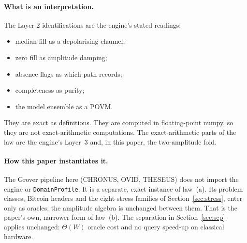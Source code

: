 \documentclass[11pt]{article}
\theoremstyle{definition}
\newcommand{\code}[1]{\texttt{\small #1}}
\begin{document}
\paragraph{What is an interpretation.} The Layer-2 identifications are the engine's stated readings:
\begin{itemize}
\item median fill as a depolarising channel;
\item zero fill as amplitude damping;
\item absence flags as which-path records;
\item completeness as purity;
\item the model ensemble as a POVM.
\end{itemize}
They are exact as definitions. They are computed in floating-point numpy, so they are not exact-arithmetic
computations. The exact-arithmetic parts of the law are the engine's Layer~3 and, in this paper, the two-amplitude
fold.

\paragraph{How this paper instantiates it.} The Grover pipeline here (CHRONUS, OVID, THESEUS) does not import the
engine or \code{DomainProfile}. It is a separate, exact instance of law~(a). Its problem classes, Bitcoin headers and
the eight stress families of Section~\ref{sec:stress}, enter only as oracles; the amplitude algebra is unchanged
between them. That is the paper's own, narrower form of law~(b). The separation in Section~\ref{sec:sep} applies
unchanged: $\Theta(W)$ oracle cost and no query speed-up on classical hardware.
\end{document}
